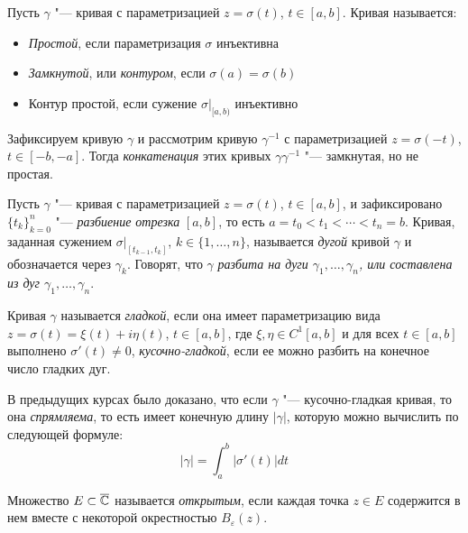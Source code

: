 \begin{definition}
	Пусть $\gamma$ "--- кривая с параметризацией $z = \sigma(t)$, $t \in [a, b]$. Кривая называется:
	\begin{itemize}
		\item \textit{Простой}, если параметризация $\sigma$ инъективна
		\item \textit{Замкнутой}, или \textit{контуром}, если $\sigma(a) = \sigma(b)$
		\item Контур простой, если сужение $\sigma|_{[a, b)}$ инъективно
	\end{itemize}
\end{definition}

\begin{example}
	Зафиксируем кривую $\gamma$ и рассмотрим кривую $\gamma^{-1}$ с параметризацией $z = \sigma(-t)$, $t \in [-b, -a]$. Тогда \textit{конкатенация} этих кривых $\gamma\gamma^{-1}$ "--- замкнутая, но не простая.
\end{example}

\begin{definition}
	Пусть $\gamma$ "--- кривая с параметризацией $z = \sigma(t)$, $t \in [a, b]$, и зафиксировано $\{t_k\}_{k = 0}^n$ "--- \textit{разбиение отрезка} $[a, b]$, то есть $a = t_0 < t_1 < \dotsb < t_n = b$. Кривая, заданная сужением $\sigma|_{[t_{k-1}, t_k]}$, $k \in \{1, \dotsc, n\}$, называется \textit{дугой} кривой $\gamma$ и обозначается через $\gamma_k$. Говорят, что $\gamma$ \textit{разбита на дуги $\gamma_1, \dotsc, \gamma_n$, или \textit{составлена} из дуг $\gamma_1, \dotsc, \gamma_n$}.
\end{definition}

\begin{definition}
	Кривая $\gamma$ называется \textit{гладкой}, если она имеет параметризацию вида $z = \sigma(t) = \xi(t) + i\eta(t)$, $t \in [a, b]$, где $\xi, \eta \in C^{1}[a, b]$ и для всех $t \in [a, b]$ выполнено $\sigma'(t) \ne 0$, \textit{кусочно-гладкой}, если ее можно разбить на конечное число гладких дуг.
\end{definition}

\begin{note}
	В предыдущих курсах было доказано, что если $\gamma$ "--- кусочно-гладкая кривая, то она \textit{спрямляема}, то есть имеет конечную длину $|\gamma|$, которую можно вычислить по следующей формуле:
	\[|\gamma| = \int_a^b|\sigma'(t)|dt\]
\end{note}

\begin{definition}
	Множество $E \subset \overline{\mathbb{C}}$ называется \textit{открытым}, если каждая точка $z \in E$ содержится в нем вместе с некоторой окрестностью $B_\varepsilon(z)$.
\end{definition}

